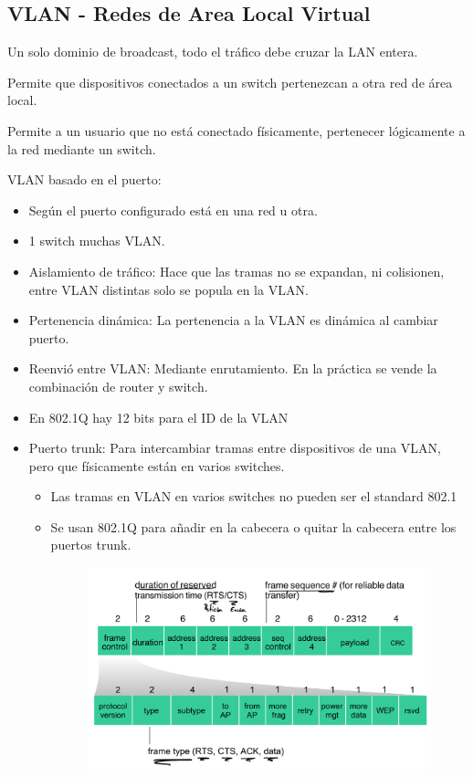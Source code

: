 \documentclass[12pt, twoside, openright]{report} %
\begin{document}
\subsection{VLAN - Redes de Area Local Virtual}



Un solo dominio de broadcast, todo el tráfico debe cruzar la LAN
entera.

Permite que dispositivos conectados a un switch pertenezcan a otra
red de área local.

Permite a un usuario que no está conectado físicamente, pertenecer
lógicamente a la red mediante un switch.

VLAN basado en el puerto:

\begin{itemize}
	\item Según el puerto configurado está en una red u otra.
	\item 1 switch muchas VLAN.
	\item Aislamiento de tráfico: Hace que las tramas no se expandan, ni
	      colisionen, entre VLAN distintas solo se popula en la VLAN.
	\item Pertenencia dinámica: La pertenencia a la VLAN es dinámica al
	      cambiar puerto.
	\item Reenvió entre VLAN: Mediante enrutamiento. En la práctica se
	      vende la combinación de router y switch.
	\item En 802.1Q hay 12 bits para el ID de la VLAN
	\item Puerto trunk: Para intercambiar tramas entre dispositivos de una
	      VLAN, pero que físicamente están en varios switches.
	      \begin{itemize}
		      \item Las tramas en VLAN en varios switches no pueden ser el standard
		            802.1
		      \item Se usan 802.1Q para añadir en la cabecera o quitar la
		            cabecera entre los puertos trunk.
		            \begin{figure}[H]
			            {\includegraphics[scale=.25]{Untitled 63.png}}
		            \end{figure}
	      \end{itemize}
\end{itemize}
\end{document}
